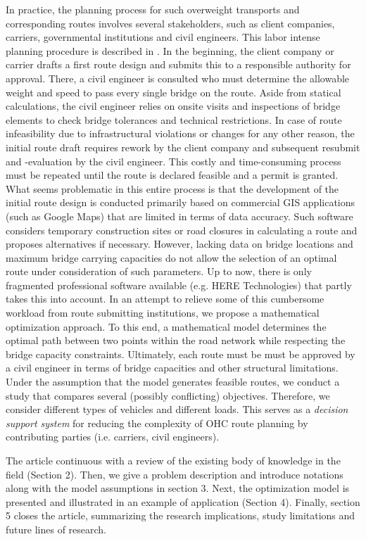 \par In practice, the planning process for such overweight transports and corresponding routes involves several stakeholders, such as client companies, carriers, governmental institutions and civil engineers.
This labor intense planning procedure is described in \cite{Osegueda.1999}. In the beginning, the client company or carrier drafts a first route design and submits this to a responsible authority for approval.
There, a civil engineer is consulted who must determine the allowable weight and speed to pass every single bridge on the route.
Aside from statical calculations, the civil engineer relies on onsite visits and inspections of bridge elements to check bridge tolerances and technical restrictions.
In case of route infeasibility due to infrastructural violations or changes for any other reason, the initial route draft requires rework by the client company and subsequent resubmit and -evaluation by the civil engineer.
This costly and time-consuming process must be repeated until the route is declared feasible and a permit is granted.
What seems problematic in this entire process is that the development of the initial route design is conducted primarily based on commercial GIS applications (such as Google Maps) that are limited in terms of data accuracy.
Such software considers temporary construction sites or road closures in calculating a route and proposes alternatives if necessary.
However, lacking data on bridge locations and maximum bridge carrying capacities do not allow the selection of an optimal route under consideration of such parameters.
Up to now, there is only fragmented professional software available (e.g. HERE Technologies) that partly takes this into account.
In an attempt to relieve some of this cumbersome workload from route submitting institutions, we propose a mathematical optimization approach.
To this end, a mathematical model determines the optimal path between two points within the road network while respecting the bridge capacity constraints.
Ultimately, each route must be must be approved by a civil engineer in terms of bridge capacities and other structural limitations. Under the assumption that the model generates feasible routes, we conduct a study that compares several (possibly conflicting) objectives.
Therefore, we consider different types of vehicles and different loads. This serves as a \textit{decision support system} for reducing the complexity of OHC route planning by contributing parties (i.e. carriers, civil engineers).
\par
The article continuous with a review of the existing body of knowledge in the field (Section 2).
Then, we give a problem description and introduce notations along with the model assumptions in section 3. Next, the optimization model is presented and illustrated in an example of application (Section 4).
Finally, section 5 closes the article, summarizing the research implications, study limitations and future lines of research.
